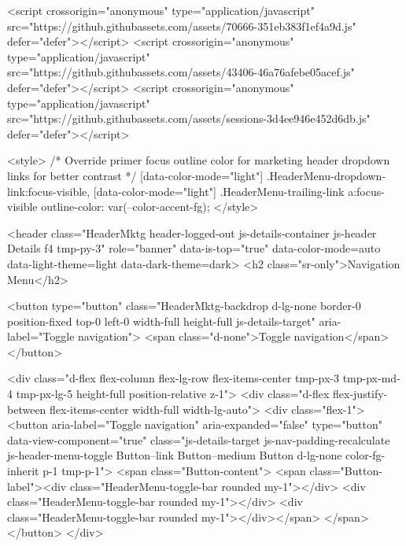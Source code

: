       

          

              
<script crossorigin="anonymous" type="application/javascript" src="https://github.githubassets.com/assets/70666-351eb383f1ef4a9d.js" defer="defer"></script>
<script crossorigin="anonymous" type="application/javascript" src="https://github.githubassets.com/assets/43406-46a76afebe05acef.js" defer="defer"></script>
<script crossorigin="anonymous" type="application/javascript" src="https://github.githubassets.com/assets/sessions-3d4ee946e452d6db.js" defer="defer"></script>

<style>
  /* Override primer focus outline color for marketing header dropdown links for better contrast */
  [data-color-mode="light"] .HeaderMenu-dropdown-link:focus-visible,
  [data-color-mode="light"] .HeaderMenu-trailing-link a:focus-visible {
    outline-color: var(--color-accent-fg);
  }
</style>

<header class="HeaderMktg header-logged-out js-details-container js-header Details f4 tmp-py-3" role="banner" data-is-top="true" data-color-mode=auto data-light-theme=light data-dark-theme=dark>
  <h2 class="sr-only">Navigation Menu</h2>

  <button type="button" class="HeaderMktg-backdrop d-lg-none border-0 position-fixed top-0 left-0 width-full height-full js-details-target" aria-label="Toggle navigation">
    <span class="d-none">Toggle navigation</span>
  </button>

  <div class="d-flex flex-column flex-lg-row flex-items-center tmp-px-3 tmp-px-md-4 tmp-px-lg-5 height-full position-relative z-1">
    <div class="d-flex flex-justify-between flex-items-center width-full width-lg-auto">
      <div class="flex-1">
        <button aria-label="Toggle navigation" aria-expanded="false" type="button" data-view-component="true" class="js-details-target js-nav-padding-recalculate js-header-menu-toggle Button--link Button--medium Button d-lg-none color-fg-inherit p-1 tmp-p-1">  <span class="Button-content">
    <span class="Button-label"><div class="HeaderMenu-toggle-bar rounded my-1"></div>
            <div class="HeaderMenu-toggle-bar rounded my-1"></div>
            <div class="HeaderMenu-toggle-bar rounded my-1"></div></span>
  </span>
</button>
      </div>

